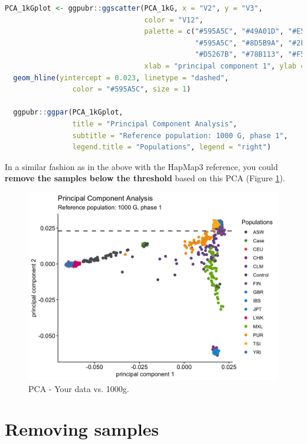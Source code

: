 \documentclass[
]{book}
\begin{document}
\begin{lstlisting}[language=R]
PCA_1kGplot <- ggpubr::ggscatter(PCA_1kG, x = "V2", y = "V3",
                                 color = "V12",
                                 palette = c("#595A5C", "#49A01D", "#E55738", "#9A3480", "#705296", 
                                             "#595A5C", "#8D5B9A", "#2F8BC9", "#1290D9", "#1396D8", 
                                             "#D5267B", "#78B113", "#F59D10", "#FBB820", "#4C81BF", "#C5D220"),
                                 xlab = "principal component 1", ylab = "principal component 2") +
  geom_hline(yintercept = 0.023, linetype = "dashed",
                color = "#595A5C", size = 1)

  ggpubr::ggpar(PCA_1kGplot,
                title = "Principal Component Analysis",
                subtitle = "Reference population: 1000 G, phase 1",
                legend.title = "Populations", legend = "right")
\end{lstlisting}

In a similar fashion as in the above with the HapMap3 reference, you could \textbf{remove the samples below the threshold} based on this PCA (Figure \ref{fig:show-pca-1000g}).

\begin{figure}

{\centering \includegraphics[width=18.67in]{img/pca-1000g} 

}

\caption{PCA - Your data vs. 1000g.}\label{fig:show-pca-1000g}
\end{figure}

\hypertarget{removing-samples}{%
\section{Removing samples}\label{removing-samples}}
\end{document}
